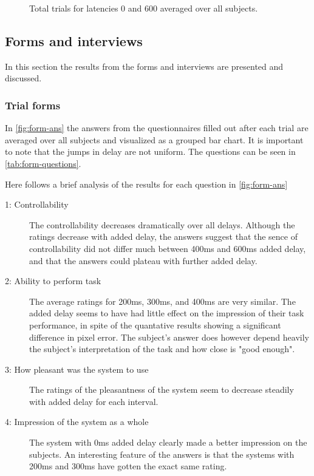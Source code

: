 \documentclass[nofilelist]{cslthse-msc}
\begin{document}
\begin{figure}[!hbt]
   \centering
   \caption{Total trials for latencies 0 and 600 averaged over all subjects.}
   \label{fig:0vs600}
\end{figure}


\subsection{Forms and interviews}
In this section the results from the forms and interviews are presented and discussed.

\subsubsection{Trial forms}
In \ref{fig:form-ans} the answers from the questionnaires filled out after each trial are averaged over all subjects and visualized as a grouped bar chart. It is important to note that the jumps in delay are not uniform. The questions can be seen in \ref{tab:form-questions}. 

Here follows a brief analysis of the results for each question in \ref{fig:form-ans}
\begin{description}
   \item[1: Controllability] 
   The controllability decreases dramatically over all delays. Although the ratings decrease with added delay, the answers suggest that the sence of controllability did not differ much between 400ms and 600ms added delay, and that the answers could plateau with further added delay.  

   \item[2: Ability to perform task] 
   The average ratings for 200ms, 300ms, and 400ms are very similar. The added delay seems to have had little effect on the impression of their task performance, in spite of the quantative results showing a significant difference in pixel error. The subject's answer does however depend heavily the subject's interpretation of the task and how close is "good enough".
 
   \item[3: How pleasant was the system to use]
   The ratings of the pleasantness of the system seem to decrease steadily with added delay for each interval.

   \item[4: Impression of the system as a whole] 
   The system with 0ms added delay clearly made a better impression on the subjects. An interesting feature of the answers is that the systems with 200ms and 300ms have gotten the exact same rating.

\end{description}
\end{document}
